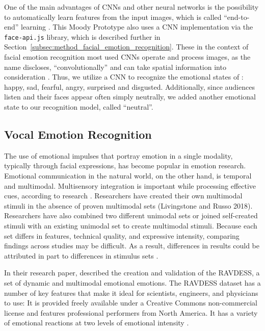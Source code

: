 One of the main advantages of CNNs and other neural networks is the possibility to automatically learn features from the input images, which is called ``end-to-end'' learning \cite{ko_brief_2018}. This Moody Prototype also uses a CNN implementation via the \texttt{face-api.js} library, which is described further in Section~\ref{subsec:method_facial_emotion_recognition}. These in the context of facial emotion recognition most used CNNs operate and process images, as the name discloses, ``convolutionally'' and can take spatial information into consideration \cite{ko_brief_2018, rosler_reducing_2021}. Thus, we utilize a CNN to recognize the emotional states of : happy, sad, fearful, angry, surprised and disgusted. Additionally, since audiences listen and their faces appear often simply neutrally, we added another emotional state to our recognition model, called ``neutral''.

\subsection{Vocal Emotion Recognition}
\label{subsec:related_work_vocal_emotion_recognition}
The use of emotional impulses that portray emotion in a single modality, typically through facial expressions, has become popular in emotion research. Emotional communication in the natural world, on the other hand, is temporal and multimodal. Multisensory integration is important while processing effective cues, according to research \cite{livingstone_ryerson_2018}. Researchers have created their own multimodal stimuli in the absence of proven multimodal sets (Livingstone and Russo 2018). Researchers have also combined two different unimodal sets \cite{delle-vigne_subclinical_2014} or joined self-created stimuli with an existing unimodal set \cite{zvyagintsev_attention_2013} to create multimodal stimuli. Because each set differs in features, technical quality, and expressive intensity, comparing findings across studies may be difficult. As a result, differences in results could be attributed in part to differences in stimulus sets \cite{livingstone_ryerson_2018}.

In their research paper,  described the creation and validation of the RAVDESS, a set of dynamic and multimodal emotional emotions. The RAVDESS dataset has a number of key features that make it ideal for scientists, engineers, and physicians to use: It is provided freely available under a Creative Commons non-commercial license and features professional performers from North America. It has a variety of emotional reactions at two levels of emotional intensity \cite{livingstone_ryerson_2018}. 


